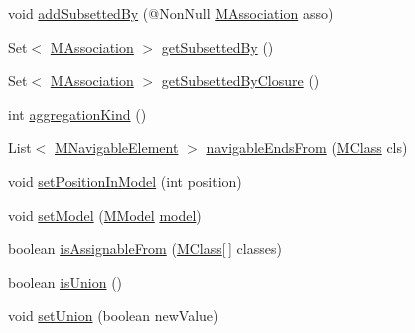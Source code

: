 \begin{DoxyCompactItemize}
\item 
void \hyperlink{interfaceorg_1_1tzi_1_1use_1_1uml_1_1mm_1_1_m_association_a4ed748dcedde8310382895a4b1cf7a15}{add\-Subsetted\-By} (@Non\-Null \hyperlink{interfaceorg_1_1tzi_1_1use_1_1uml_1_1mm_1_1_m_association}{M\-Association} asso)
\item 
Set$<$ \hyperlink{interfaceorg_1_1tzi_1_1use_1_1uml_1_1mm_1_1_m_association}{M\-Association} $>$ \hyperlink{interfaceorg_1_1tzi_1_1use_1_1uml_1_1mm_1_1_m_association_aa3481035a20115400f96b145758d06e5}{get\-Subsetted\-By} ()
\item 
Set$<$ \hyperlink{interfaceorg_1_1tzi_1_1use_1_1uml_1_1mm_1_1_m_association}{M\-Association} $>$ \hyperlink{interfaceorg_1_1tzi_1_1use_1_1uml_1_1mm_1_1_m_association_a5044f6f062f089417d45ead374cbe832}{get\-Subsetted\-By\-Closure} ()
\item 
int \hyperlink{interfaceorg_1_1tzi_1_1use_1_1uml_1_1mm_1_1_m_association_acf331e431d6610ed02c2b6a6b0e7f025}{aggregation\-Kind} ()
\item 
List$<$ \hyperlink{interfaceorg_1_1tzi_1_1use_1_1uml_1_1mm_1_1_m_navigable_element}{M\-Navigable\-Element} $>$ \hyperlink{interfaceorg_1_1tzi_1_1use_1_1uml_1_1mm_1_1_m_association_aa7729fea20958c5d9025c228fa44fe60}{navigable\-Ends\-From} (\hyperlink{interfaceorg_1_1tzi_1_1use_1_1uml_1_1mm_1_1_m_class}{M\-Class} cls)
\item 
void \hyperlink{interfaceorg_1_1tzi_1_1use_1_1uml_1_1mm_1_1_m_association_ae00b17b3ca83245c88cffdb45ab63e14}{set\-Position\-In\-Model} (int position)
\item 
void \hyperlink{interfaceorg_1_1tzi_1_1use_1_1uml_1_1mm_1_1_m_association_af71ad4bfed7c4aa40ec5c374165b3390}{set\-Model} (\hyperlink{classorg_1_1tzi_1_1use_1_1uml_1_1mm_1_1_m_model}{M\-Model} \hyperlink{interfaceorg_1_1tzi_1_1use_1_1uml_1_1mm_1_1_m_classifier_a34f38310d790d7b565c396c2dcec38b8}{model})
\item 
boolean \hyperlink{interfaceorg_1_1tzi_1_1use_1_1uml_1_1mm_1_1_m_association_acce276ee73211c797d82160adef0343e}{is\-Assignable\-From} (\hyperlink{interfaceorg_1_1tzi_1_1use_1_1uml_1_1mm_1_1_m_class}{M\-Class}\mbox{[}$\,$\mbox{]} classes)
\item 
boolean \hyperlink{interfaceorg_1_1tzi_1_1use_1_1uml_1_1mm_1_1_m_association_a5ce5fce954c496ff6b6b228d8d7d83e3}{is\-Union} ()
\item 
void \hyperlink{interfaceorg_1_1tzi_1_1use_1_1uml_1_1mm_1_1_m_association_a629b547965398dcde7269c6c166001a1}{set\-Union} (boolean new\-Value)
\item 

\end{DoxyCompactItemize}
